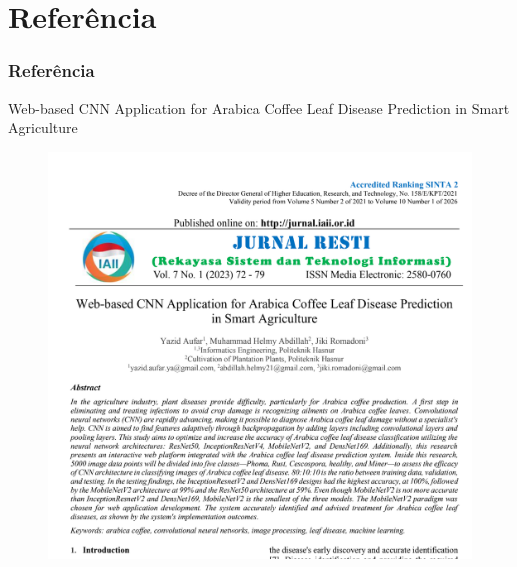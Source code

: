 \documentclass[aspectratio=169]{beamer}
\begin{document}



\section{Referência}

\begin{frame}
    \frametitle{Referência}

    \begin{block}{}
        Web-based CNN Application for Arabica Coffee Leaf Disease Prediction in Smart Agriculture
    \end{block}

    \begin{figure}
        \centering
        \includegraphics[scale = 0.35 ]{img/ref.png}
        \label{fig:enter-label}
    \end{figure}

\end{frame}


\end{document}
